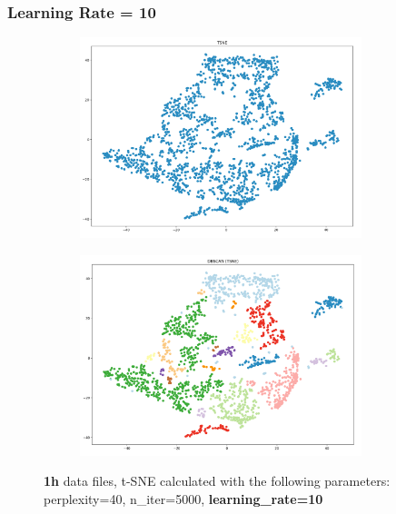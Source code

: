 
\subsubsection{Learning Rate = 10}
\begin{figure}[H]
  \centering
  \begin{subfigure}{.5\textwidth}
    \centering
    \includegraphics[width=0.9\textwidth]{./images/tsneParametersTest/learningRate/lr10-1hTSNE.png}
  \end{subfigure}%
  \begin{subfigure}{.5\textwidth}
    \centering
    \includegraphics[width=0.9\textwidth]{./images/tsneParametersTest/learningRate/lr10-1hDBSCAN.png}
  \end{subfigure}
	\caption{\textbf{1h} data files, t-SNE calculated with the following parameters: perplexity=40, n\_iter=5000, \textbf{learning\_rate=10}}
	\label{figure:1hlr10TSNE}
\end{figure}

